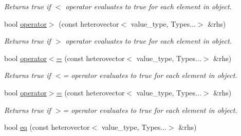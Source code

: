 \begin{DoxyCompactItemize}
\begin{DoxyCompactList}\small\item\em Returns true if $<$ operator evaluates to true for each element in object. \end{DoxyCompactList}\item 
\hypertarget{classheterogeneous_1_1heterovector_3_01_t_00_01_u_00_01_types_8_8_8_4_a8a69caabdf8c6bf8dc6c34de2716b200}{}bool \hyperlink{classheterogeneous_1_1heterovector_3_01_t_00_01_u_00_01_types_8_8_8_4_a8a69caabdf8c6bf8dc6c34de2716b200}{operator$>$} (const heterovector$<$ value\+\_\+type, Types...$>$ \&rhs)\label{classheterogeneous_1_1heterovector_3_01_t_00_01_u_00_01_types_8_8_8_4_a8a69caabdf8c6bf8dc6c34de2716b200}

\begin{DoxyCompactList}\small\item\em Returns true if $>$ operator evaluates to true for each element in object. \end{DoxyCompactList}\item 
\hypertarget{classheterogeneous_1_1heterovector_3_01_t_00_01_u_00_01_types_8_8_8_4_af7976b8320749a3bc7e9c4da57524870}{}bool \hyperlink{classheterogeneous_1_1heterovector_3_01_t_00_01_u_00_01_types_8_8_8_4_af7976b8320749a3bc7e9c4da57524870}{operator$<$=} (const heterovector$<$ value\+\_\+type, Types...$>$ \&rhs)\label{classheterogeneous_1_1heterovector_3_01_t_00_01_u_00_01_types_8_8_8_4_af7976b8320749a3bc7e9c4da57524870}

\begin{DoxyCompactList}\small\item\em Returns true if $<$= operator evaluates to true for each element in object. \end{DoxyCompactList}\item 
\hypertarget{classheterogeneous_1_1heterovector_3_01_t_00_01_u_00_01_types_8_8_8_4_a7860943d8c08be5fc5e187781f1f9282}{}bool \hyperlink{classheterogeneous_1_1heterovector_3_01_t_00_01_u_00_01_types_8_8_8_4_a7860943d8c08be5fc5e187781f1f9282}{operator$>$=} (const heterovector$<$ value\+\_\+type, Types...$>$ \&rhs)\label{classheterogeneous_1_1heterovector_3_01_t_00_01_u_00_01_types_8_8_8_4_a7860943d8c08be5fc5e187781f1f9282}

\begin{DoxyCompactList}\small\item\em Returns true if $>$= operator evaluates to true for each element in object. \end{DoxyCompactList}\item 
\hypertarget{classheterogeneous_1_1heterovector_3_01_t_00_01_u_00_01_types_8_8_8_4_ac83562ee4f67f991371d417b7cfa70ef}{}bool \hyperlink{classheterogeneous_1_1heterovector_3_01_t_00_01_u_00_01_types_8_8_8_4_ac83562ee4f67f991371d417b7cfa70ef}{eq} (const heterovector$<$ value\+\_\+type, Types...$>$ \&rhs)\label{classheterogeneous_1_1heterovector_3_01_t_00_01_u_00_01_types_8_8_8_4_ac83562ee4f67f991371d417b7cfa70ef}


\end{DoxyCompactItemize}
